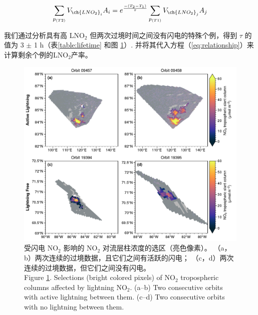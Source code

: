 \begin{equation} \label{eq:LNO2_nolightning}
\sum_{p_{(T2)}} V_{\ch{LNO_2}_i} A_{i} = e^\frac{{-(T_2-T_1)}}{\tau} \sum_{p_{(T1)}} V_{\ch{LNO_2}_j} A_{j}
\end{equation}

我们通过分析具有高 LNO$_2$ 但两次过境时间之间没有闪电的特殊个例，得到 $\tau$ 的值为 3 $\pm$ 1 h（表\ref{table:lifetime} 和图 \ref{fig:consecutive_orbits}）.
并将其代入方程（\ref{eq:relationship}）来计算剩余个例的LNO$_2$产率。


\begin{figure}[!htbp]
\centering
\includegraphics[width=13cm]{./figures/arctic_consecutive_orbits.pdf}
\caption{
受闪电 NO$_2$ 影响的 NO$_2$ 对流层柱浓度的选区（亮色像素）。
（a，b）两次连续的过境数据，且它们之间有活跃的闪电；
（c，d）两次连续的过境数据，但它们之间没有闪电。\\
Figure \ref{fig:consecutive_orbits}.
Selections (bright colored pixels) of NO$_2$ tropospheric columns affected by lightning NO$_2$.
(a--b) Two consecutive orbits with active lightning between them.
(c--d) Two consecutive orbits with no lightning between them.
}
\label{fig:consecutive_orbits}
\end{figure}


